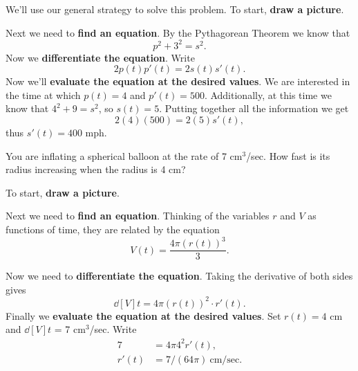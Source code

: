 \begin{solution}
We'll use our general strategy to solve this problem. To start,
\textbf{draw a picture}.


Next we need to \textbf{find an equation}. By the Pythagorean Theorem
we know that
\[
p^2+3^2=s^2.
\] 
Now we \textbf{differentiate the equation}. Write
\[
2p(t)p'(t)  = 2s(t) s'(t).
\] 
Now we'll \textbf{evaluate the equation at the desired values}.  We
are interested in the time at which $p(t)=4$ and $p'(t) =
500$. Additionally, at this time we know that $4^2+9=s^2$, so
$s(t)=5$.  Putting together all the information we get
\[
2(4)(500)=2(5)s'(t),
\]
thus $s'(t)=400$ mph.
\end{solution}





\begin{example}
You are inflating a spherical balloon at the rate of 7 cm${}^3$/sec.  How
fast is its radius increasing when the radius is 4 cm?
\end{example}

\begin{solution}
To start, \textbf{draw a picture}.


Next we need to \textbf{find an equation}.  Thinking of the variables
$r$ and $V$ as functions of time, they are related by the equation
\[
V(t)=\frac{4\pi (r(t))^3}{3}.
\]

Now we need to \textbf{differentiate the equation}.  Taking the
derivative of both sides gives 
\[
\dd[V]{t}=4\pi (r(t))^2\cdot r'(t).
\]  
Finally we \textbf{evaluate the equation at the desired values}. Set
$r(t)= 4$ cm and $\dd[V]{t}$ = 7 cm$^3$/sec. Write 
\begin{align*}
7 &=4\pi 4^2r'(t),\\
r'(t) &=7/(64\pi)~\text{cm/sec}.
\end{align*}
\end{solution}

